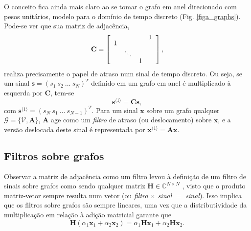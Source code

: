 O conceito fica ainda mais claro ao se tomar o grafo em anel direcionado com pesos unit\'arios, modelo para o dom\'inio de tempo discreto (Fig. \ref{figa_graphs}). Pode-se ver que sua matriz de adjac\^encia,
\begin{equation}\label{eq:C}
\mathbf{C} =
\left[\renewcommand{\arraystretch}{0.65}\begin{array}{cccc}
&  &  &   1\\ 
1 &  &   & \\ 
&   \ddots &  & \\ 
&  &   1 & 
\end{array}\right],
\end{equation}
\noindent realiza precisamente o papel de atraso num sinal de tempo discreto. Ou seja, se um sinal $ \mathbf{s} = (s_1 \ s_2 \ \dots \ s_N)^T $ definido em um grafo em anel \'e multiplicado \`a  esquerda por $ \mathbf{C} $, tem-se
\begin{equation}\label{eq:graph_shift_C}
\mathbf{s}^{\langle 1 \rangle} = \mathbf{C} \mathbf{s},
\end{equation}
com $ \mathbf{s}^{\langle 1 \rangle} = (s_N \ s_1 \ \dots \ s_{N-1})^T $.
Para um sinal $ \mathbf{x} $ sobre um grafo qualquer $ \mathcal{G} = \{\mathcal{V}, \mathbf{A}\} $, $ \mathbf{A} $ age como um \emph{filtro} de atraso (ou deslocamento) sobre $ \mathbf{x} $, e a vers\~ao deslocada deste sinal \'e representada por $ \mathbf{x}^{\langle 1 \rangle} = \mathbf{A} \mathbf{x}$.


\subsection{Filtros sobre grafos}
\label{subsec:filtros}

Observar a matriz de adjac\^encia como um filtro levou \`a defini\c c\~ao de um filtro de sinais sobre grafos como sendo qualquer matriz $ \mathbf{H} \in \mathbb{C}^{N \times N} $ \cite{sandryhaila2013filters}, visto que o produto matriz-vetor sempre resulta num vetor (ou \emph{filtro} $ \times $ \emph{sinal} $ = $ \emph{sinal}). Isso implica que os filtros sobre grafos s\~ao sempre lineares, uma vez que a distributividade da multiplica\c c\~ao em rela\c c\~ao \`a adi\c c\~ao matricial garante que
\begin{equation}
\mathbf{H} (\alpha_1 \mathbf{x}_1 + \alpha_2 \mathbf{x}_2) =  \alpha_1 \mathbf{H} \mathbf{x}_1 + \alpha_2 \mathbf{H}  \mathbf{x}_2.
\end{equation}

